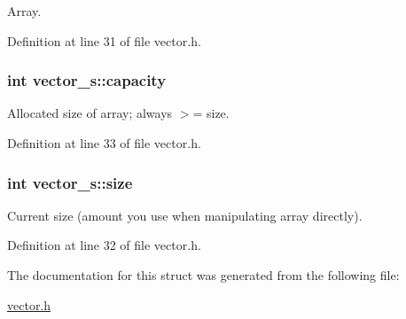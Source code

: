 \-Array. 



\-Definition at line 31 of file vector.\-h.

\hypertarget{structvector__s_a8db5892656cbc148d5bf3b8fcb144df9}{
\subsubsection[{capacity}]{\setlength{\rightskip}{0pt plus 5cm}int {\bf vector\-\_\-s\-::capacity}}}\label{structvector__s_a8db5892656cbc148d5bf3b8fcb144df9}


\-Allocated size of array; always $>$= size. 



\-Definition at line 33 of file vector.\-h.

\hypertarget{structvector__s_a817205845ca0191af990f05b62e587b9}{
\subsubsection[{size}]{\setlength{\rightskip}{0pt plus 5cm}int {\bf vector\-\_\-s\-::size}}}\label{structvector__s_a817205845ca0191af990f05b62e587b9}


\-Current size (amount you use when manipulating array directly). 



\-Definition at line 32 of file vector.\-h.



\-The documentation for this struct was generated from the following file\-:\begin{DoxyCompactItemize}
\item 
\hyperlink{vector_8h}{vector.\-h}\end{DoxyCompactItemize}

